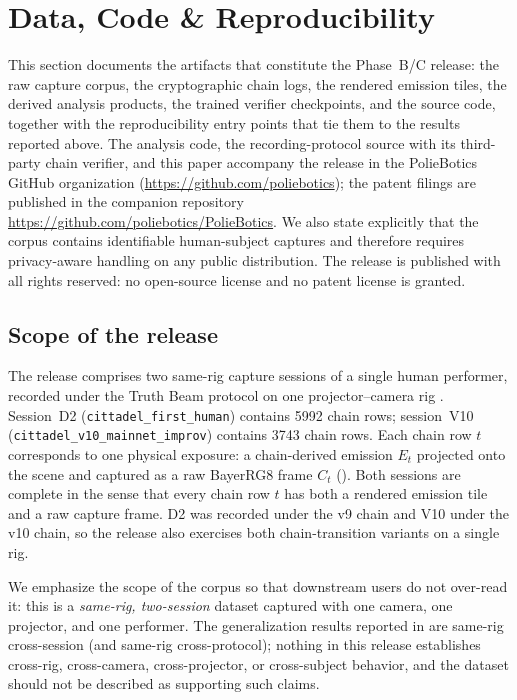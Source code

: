 \section{Data, Code \& Reproducibility}
\label{sec:availability}

This section documents the artifacts that constitute the Phase~B/C release: the raw capture corpus, the cryptographic chain logs, the rendered emission tiles, the derived analysis products, the trained verifier checkpoints, and the source code, together with the reproducibility entry points that tie them to the results reported above. The analysis code, the recording-protocol source with its third-party chain verifier, and this paper accompany the release in the PolieBotics GitHub organization (\url{https://github.com/poliebotics}); the patent filings are published in the companion repository \url{https://github.com/poliebotics/PolieBotics}. We also state explicitly that the corpus contains identifiable human-subject captures and therefore requires privacy-aware handling on any public distribution. The release is published with all rights reserved: no open-source license and no patent license is granted.

\subsection{Scope of the release}
\label{sec:availability:scope}

The release comprises two same-rig capture sessions of a single human performer, recorded under the Truth Beam protocol on one projector--camera rig \cite{patent2025}. Session~D2 (\texttt{cittadel\_first\_human}) contains \num{5992} chain rows; session~V10 (\texttt{cittadel\_v10\_mainnet\_improv}) contains \num{3743} chain rows. Each chain row $t$ corresponds to one physical exposure: a chain-derived emission $E_t$ projected onto the scene and captured as a raw BayerRG8 frame $C_t$ (). Both sessions are complete in the sense that every chain row $t$ has both a rendered emission tile and a raw capture frame. D2 was recorded under the v9 chain and V10 under the v10 chain, so the release also exercises both chain-transition variants on a single rig.

We emphasize the scope of the corpus so that downstream users do not over-read it: this is a \emph{same-rig, two-session} dataset captured with one camera, one projector, and one performer. The generalization results reported in  are same-rig cross-session (and same-rig cross-protocol); nothing in this release establishes cross-rig, cross-camera, cross-projector, or cross-subject behavior, and the dataset should not be described as supporting such claims.

